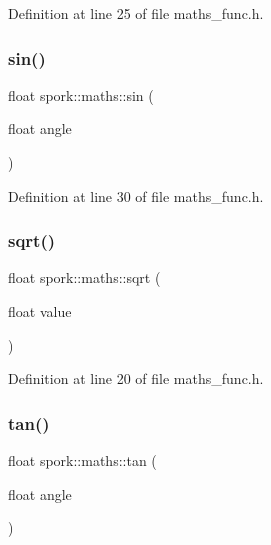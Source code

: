 Definition at line 25 of file maths\+\_\+func.\+h.

\mbox{\label{namespacespork_1_1maths_a059ac1ec891e33b831ca67a6174c8ad8}} 
\subsubsection{\texorpdfstring{sin()}{sin()}}
{\footnotesize\ttfamily float spork\+::maths\+::sin (\begin{DoxyParamCaption}\item[{float}]{angle }\end{DoxyParamCaption})\hspace{0.3cm}{\ttfamily [inline]}}



Definition at line 30 of file maths\+\_\+func.\+h.

\mbox{\label{namespacespork_1_1maths_a9b6e4ae0fa6afa5d30e3c077e5c2102f}} 
\subsubsection{\texorpdfstring{sqrt()}{sqrt()}}
{\footnotesize\ttfamily float spork\+::maths\+::sqrt (\begin{DoxyParamCaption}\item[{float}]{value }\end{DoxyParamCaption})\hspace{0.3cm}{\ttfamily [inline]}}



Definition at line 20 of file maths\+\_\+func.\+h.

\mbox{\label{namespacespork_1_1maths_a2e3fc6759119a0890eff6b58eed1ed2a}} 
\subsubsection{\texorpdfstring{tan()}{tan()}}
{\footnotesize\ttfamily float spork\+::maths\+::tan (\begin{DoxyParamCaption}\item[{float}]{angle }\end{DoxyParamCaption})\hspace{0.3cm}{\ttfamily [inline]}}



